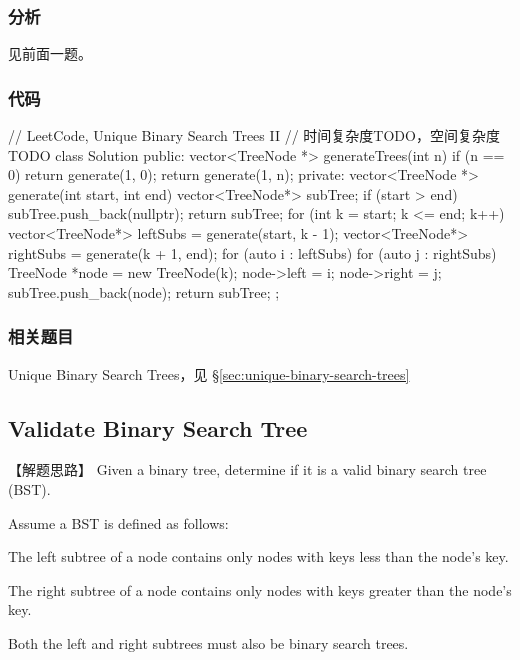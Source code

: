 \subsubsection{分析}
见前面一题。


\subsubsection{代码}

\begin{Code}
	// LeetCode, Unique Binary Search Trees II
	// 时间复杂度TODO，空间复杂度TODO
	class Solution {
		public:
		vector<TreeNode *> generateTrees(int n) {
			if (n == 0) return generate(1, 0);
			return generate(1, n);
		}
		private:
		vector<TreeNode *> generate(int start, int end) {
			vector<TreeNode*> subTree;
			if (start > end) {
				subTree.push_back(nullptr);
				return subTree;
			}
			for (int k = start; k <= end; k++) {
				vector<TreeNode*> leftSubs = generate(start, k - 1);
				vector<TreeNode*> rightSubs = generate(k + 1, end);
				for (auto i : leftSubs) {
					for (auto j : rightSubs) {
						TreeNode *node = new TreeNode(k);
						node->left = i;
						node->right = j;
						subTree.push_back(node);
					}
				}
			}
			return subTree;
		}
	};
\end{Code}


\subsubsection{相关题目}
\begindot
\item Unique Binary Search Trees，见 \S \ref{sec:unique-binary-search-trees}
\myenddot


\subsection{Validate Binary Search Tree}
\label{sec:validate-binary-search-tree}


【解题思路】
Given a binary tree, determine if it is a valid binary search tree (BST).

Assume a BST is defined as follows:
\begindot
\item The left subtree of a node contains only nodes with keys less than the node's key.
\item The right subtree of a node contains only nodes with keys greater than the node's key.
\item Both the left and right subtrees must also be binary search trees.
\myenddot



